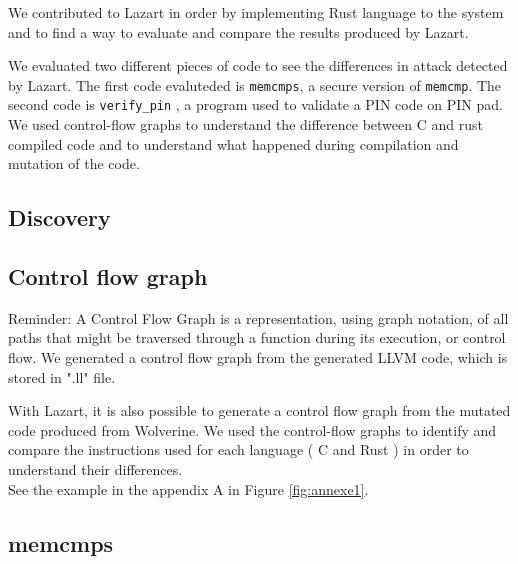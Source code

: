 We contributed to Lazart in order by implementing Rust language to the system and to find a way to evaluate and compare the results produced by Lazart.

We evaluated two different pieces of code to see the differences in attack detected by Lazart.
The first code evaluteded is \texttt{memcmps}, a secure version of \texttt{memcmp}.
The second code is \texttt{verify\_pin} , a program used to validate a PIN code on PIN pad.
We used control-flow graphs to understand the difference between C and rust compiled code and to understand what happened during compilation and mutation of the code.


\subsection{Discovery}


\subsection{Control flow graph}
Reminder: A Control Flow Graph is a representation, using graph notation, of all paths that might be traversed through a function during its execution, or control flow.
We generated a control flow graph from the generated LLVM code, which is stored in ".ll" file.

With Lazart, it is also possible to generate a control flow graph from the mutated code produced from Wolverine.
We used the control-flow graphs to identify and compare the instructions used for each language ( C and Rust ) in order to understand their differences.\\

See the example in the appendix A in Figure \ref{fig:annexe1}.
\subsection{memcmps}

